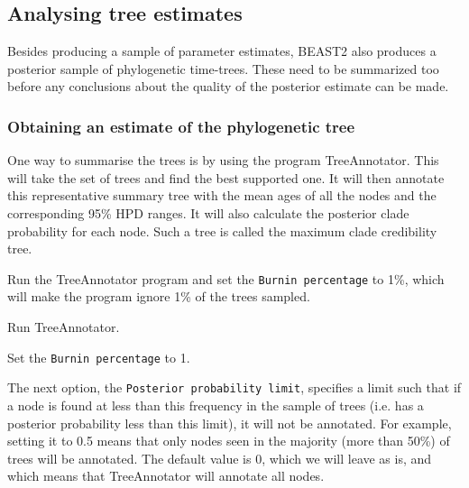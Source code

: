 \documentclass[11pt]{article}
\begin{document}

\subsection{Analysing tree estimates}

Besides producing a sample of parameter estimates, BEAST2 also produces a posterior sample of phylogenetic time-trees. These need to be summarized too before any conclusions about the quality of the posterior estimate can be made.

\subsubsection{Obtaining an estimate of the phylogenetic tree}

One way to summarise the trees is by using the program TreeAnnotator. This will take the set of trees and find the best supported one. It will then annotate this representative summary tree with the mean ages of all the nodes and the corresponding 95\% HPD ranges. It will also calculate the posterior clade probability for each node. Such a tree is called the maximum clade credibility tree.

Run the TreeAnnotator program and set the \texttt{Burnin percentage} to 1\%, which will make the program ignore 1\% of the trees sampled.

\begin{framed}
Run TreeAnnotator.

Set the \texttt{Burnin percentage} to 1.
\end{framed}

The next option, the \texttt{Posterior probability limit}, specifies a limit such that if a node is found at less than this frequency in the sample of trees (i.e. has a posterior probability less than this limit), it will not be annotated. For example, setting it to 0.5 means that only nodes seen in the majority (more than 50\%) of trees will be annotated. The default value is 0, which we will leave as is, and which means that TreeAnnotator will annotate all nodes.
\end{document}
